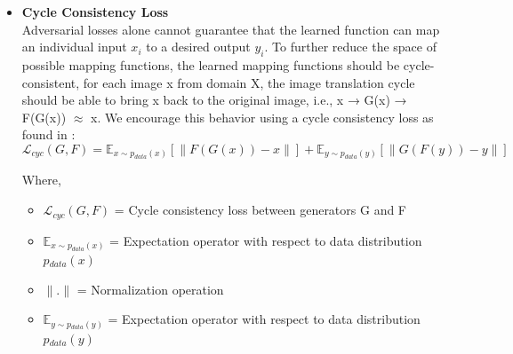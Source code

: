 \begin{itemize}
  \item \textbf{Cycle Consistency Loss} \\
        Adversarial losses alone cannot guarantee that the learned function can map an individual input $x_i$ to a desired output $y_i$. To further reduce the space of possible mapping functions, the learned mapping functions should be cycle-consistent, for each image x from domain X, the image translation
        cycle should be able to bring x back to the original image,
        i.e., x → G(x) → F(G(x)) $\approx$ x. We encourage this behavior using a cycle consistency loss as found in \cite{zhu2020unpaired}:
        \begin{equation}
          \mathcal{L}_{cyc}\left(G,F\right) = \mathbb{E}_{x\sim p{_{data}}\left(x\right)}[\|F\left(G\left(x\right)\right) - x \|]
          + \mathbb{E}_{y\sim p{_{data}}\left(y\right)}[\|G\left(F\left(y\right)\right) - y\|]
        \end{equation}

        Where,
        \begin{itemize}
            \item $\mathcal{L}_{cyc}\left(G,F\right)$ = Cycle consistency loss between generators G and F
            \item $\mathbb{E}_{x\sim p{_{data}}\left(x\right)}$ = Expectation operator with respect to data distribution $p{_{data}}\left(x\right)$
            \item $\|.\|$ = Normalization operation
            \item $\mathbb{E}_{y\sim p{_{data}}\left(y\right)}$ = Expectation operator with respect to data distribution $p{_{data}}\left(y\right)$
            
        \end{itemize}

\end{itemize}

